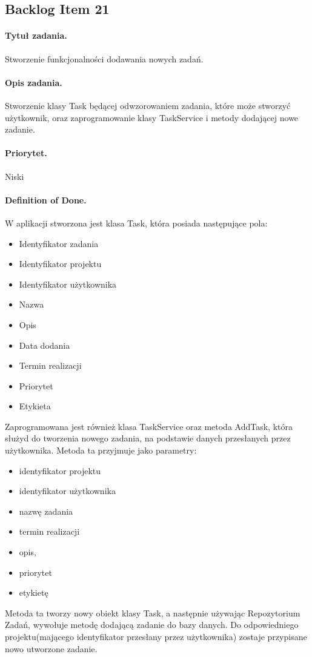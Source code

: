 ﻿\documentclass[a4paper]{article}
\begin{document}
\subsection{Backlog Item 21} 
\paragraph{Tytuł zadania.}  Stworzenie funkcjonalności dodawania nowych zadań.
\paragraph{Opis zadania.} Stworzenie klasy Task będącej odwzorowaniem zadania, które może stworzyć użytkownik, oraz zaprogramowanie klasy TaskService i metody dodającej nowe zadanie.
\paragraph{Priorytet.} Niski
\paragraph{Definition of Done.} W aplikacji stworzona jest klasa Task, która posiada następujące pola:
\begin{itemize}
\item Identyfikator zadania
\item Identyfikator projektu
\item Identyfikator użytkownika
\item Nazwa
\item Opis
\item Data dodania
\item Termin realizacji
\item Priorytet
\item Etykieta
\end{itemize}
Zaprogramowana jest również klasa TaskService oraz metoda AddTask, która służyd do tworzenia nowego zadania, na podstawie danych przesłanych przez użytkownika. Metoda ta przyjmuje jako parametry:
\begin{itemize}
\item identyfikator projektu
\item identyfikator użytkownika
\item nazwę zadania
\item termin realizacji
\item opis, 
\item priorytet
\item etykietę
\end{itemize}
Metoda ta tworzy nowy obiekt klasy Task, a następnie używając Repozytorium Zadań, wywołuje metodę dodającą zadanie do bazy danych. Do odpowiedniego projektu(mającego identyfikator przesłany przez użytkownika) zostaje przypisane nowo utworzone zadanie.
\end{document}
